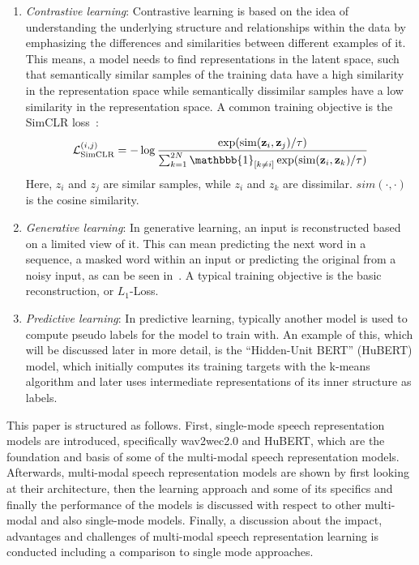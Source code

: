 \begin{enumerate}
    \item \textit{Contrastive learning}: Contrastive learning is based on the idea of understanding the underlying structure and relationships within the data by emphasizing the differences and similarities between different examples of it. This means, a model needs to find representations in the latent space, such that semantically similar samples of the training data have a high similarity in the representation space while semantically dissimilar samples have a low similarity in the representation space. A common training objective is the SimCLR loss~\cite{simclr}: $$\mathcal{L}_\text{SimCLR}^{(i,j)} = - \log\frac{\exp(\text{sim}(\mathbf{z}_i, \mathbf{z}_j) / \tau)}{\sum_{k=1}^{2N} \mathbbb{1}_{[k \neq i]} \exp(\text{sim}(\mathbf{z}_i, \mathbf{z}_k) / \tau)}$$Here, $z_i$ and $z_j$ are similar samples, while $z_i$ and $z_k$ are dissimilar. $sim(\cdot,\cdot)$ is the cosine similarity.
    \item \textit{Generative learning}: In generative learning, an input is reconstructed based on a limited view of it. This can mean predicting the next word in a sequence, a masked word within an input or predicting the original from a noisy input, as can be seen in~\cite{denoising-autoencoder}. A typical training objective is the basic reconstruction, or $L_1$-Loss.
    \item \textit{Predictive learning}: In predictive learning, typically another model is used to compute pseudo labels for the model to train with. An example of this, which will be discussed later in more detail, is the ``Hidden-Unit BERT'' (HuBERT) model, which initially computes its training targets with the k-means algorithm and later uses intermediate representations of its inner structure as labels.
\end{enumerate}
This paper is structured as follows. First, single-mode speech representation models are introduced, specifically wav2wec2.0 and HuBERT, which are the foundation and basis of some of the multi-modal speech representation models. Afterwards, multi-modal speech representation models are shown by first looking at their architecture, then the learning approach and some of its specifics and finally the performance of the models is discussed with respect to other multi-modal and also single-mode models. Finally, a discussion about the impact, advantages and challenges of multi-modal speech representation learning is conducted including a comparison to single mode approaches.
